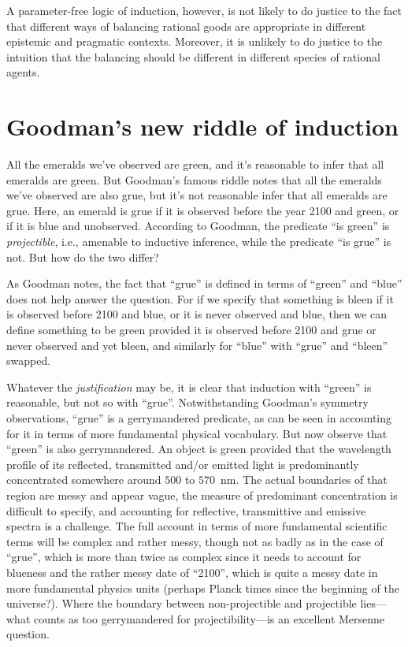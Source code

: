 A parameter-free logic of induction, however, is not likely to do justice to the fact that different ways of balancing
rational goods are appropriate in different epistemic and pragmatic contexts. Moreover, it is unlikely to do justice
to the intuition that the balancing should be different in different species of rational agents.

\section{Goodman's new riddle of induction}
All the emeralds we've observed are green, and it's reasonable to infer that all emeralds are green.
But Goodman's famous riddle notes that all the emeralds we've observed are also grue, but it's not reasonable infer 
that all emeralds are grue. Here, an emerald is grue if it is observed before the year 2100 and green, or if it is 
blue and unobserved. According to Goodman, the predicate ``is green'' is \textit{projectible}, i.e., amenable to 
inductive inference, while the predicate ``is grue'' is not. But how do the two differ?

As Goodman notes, the fact that ``grue'' is defined in terms of ``green'' and ``blue'' does not help answer the
question. For if we specify that something is bleen if it is observed before 2100 and blue, or it is never observed
and blue, then we can define something to be green provided it is observed before 2100 and grue or never observed
and yet bleen, and similarly for ``blue'' with ``grue'' and ``bleen'' swapped. 

Whatever the \textit{justification} may be, it is clear that induction with ``green'' is reasonable, but not so with
``grue''. Notwithstanding Goodman's symmetry observations, ``grue'' is a gerrymandered predicate, as can be seen in
accounting for it in terms of more fundamental physical vocabulary. But now observe that ``green'' is also gerrymandered. 
An object is green provided that the wavelength profile of its reflected, transmitted and/or emitted light is predominantly 
concentrated somewhere around $500$ to $570$~nm. The actual boundaries of that region are messy and appear vague, the measure of
predominant concentration is difficult to specify, and accounting for reflective, transmittive and emissive spectra
is a challenge. The full account in terms of more fundamental scientific terms will be complex and rather messy, though 
not as badly as in the case of ``grue'', which is more than twice as complex since it needs to account for blueness
and the rather messy date of ``2100'', which is quite a messy date in more fundamental physics units (perhaps 
Planck times since the beginning of the universe?). Where the boundary between non-projectible and projectible lies---what
counts as too gerrymandered for projectibility---is an excellent Mersenne question.


